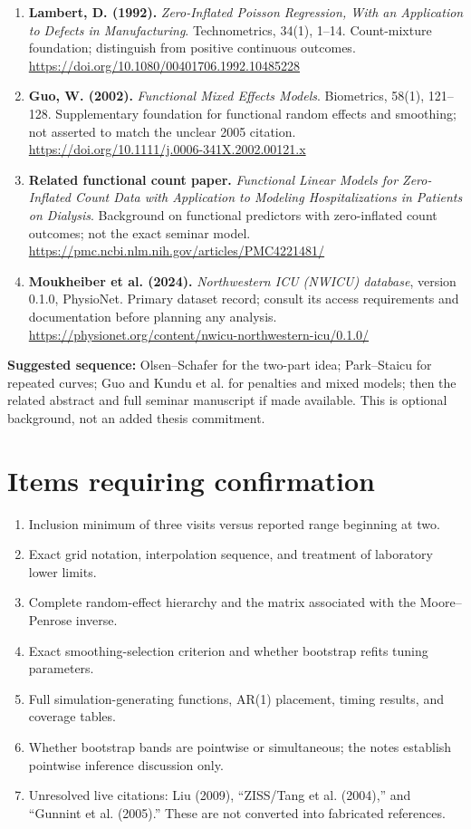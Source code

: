 \documentclass[11pt]{article}
\begin{document}
\begin{enumerate}[label=\textbf{\arabic*.},leftmargin=*]
\item \textbf{Lambert, D. (1992).} \emph{Zero-Inflated Poisson Regression, With an Application to Defects in Manufacturing}. Technometrics, 34(1), 1--14. Count-mixture foundation; distinguish from positive continuous outcomes.\\\url{https://doi.org/10.1080/00401706.1992.10485228}
\item \textbf{Guo, W. (2002).} \emph{Functional Mixed Effects Models}. Biometrics, 58(1), 121--128. Supplementary foundation for functional random effects and smoothing; not asserted to match the unclear 2005 citation.\\\url{https://doi.org/10.1111/j.0006-341X.2002.00121.x}
\item \textbf{Related functional count paper.} \emph{Functional Linear Models for Zero-Inflated Count Data with Application to Modeling Hospitalizations in Patients on Dialysis}. Background on functional predictors with zero-inflated count outcomes; not the exact seminar model.\\\url{https://pmc.ncbi.nlm.nih.gov/articles/PMC4221481/}
\item \textbf{Moukheiber et al. (2024).} \emph{Northwestern ICU (NWICU) database}, version 0.1.0, PhysioNet. Primary dataset record; consult its access requirements and documentation before planning any analysis.\\\url{https://physionet.org/content/nwicu-northwestern-icu/0.1.0/}
\end{enumerate}
\textbf{Suggested sequence:} Olsen--Schafer for the two-part idea; Park--Staicu for repeated curves; Guo and Kundu et al. for penalties and mixed models; then the related abstract and full seminar manuscript if made available. This is optional background, not an added thesis commitment.
\section{Items requiring confirmation}
\begin{enumerate}
\item Inclusion minimum of three visits versus reported range beginning at two.
\item Exact grid notation, interpolation sequence, and treatment of laboratory lower limits.
\item Complete random-effect hierarchy and the matrix associated with the Moore--Penrose inverse.
\item Exact smoothing-selection criterion and whether bootstrap refits tuning parameters.
\item Full simulation-generating functions, AR(1) placement, timing results, and coverage tables.
\item Whether bootstrap bands are pointwise or simultaneous; the notes establish pointwise inference discussion only.
\item Unresolved live citations: Liu (2009), ``ZISS/Tang et al. (2004),'' and ``Gunnint et al. (2005).'' These are not converted into fabricated references.
\end{enumerate}
\end{document}
